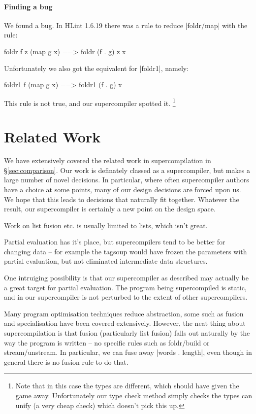 \documentclass{sigplanconf}
\begin{document}
\paragraph{Finding a bug}

We found a bug. In HLint 1.6.19 there was a rule to reduce |foldr/map| with the rule:

\begin{code}
foldr f z (map g x) ==> foldr (f . g) z x
\end{code}

Unfortunately we also got the equivalent for |foldr1|, namely:

\begin{code}
foldr1 f (map g x) ==> foldr1 (f . g) x
\end{code}

This rule is not true, and our supercompiler spotted it. \footnote{Note that in this case the types are different, which should have given the game away. Unfortunately our type check method simply checks the types can unify (a very cheap check) which doesn't pick this up.}

\section{Related Work}

We have extensively covered the related work in supercompilation in \S\ref{sec:comparison}. Our work is definately classed as a supercompiler, but makes a large number of novel decisions. In particular, where often supercompiler authors have a choice at some points, many of our design decisions are forced upon us. We hope that this leads to decisions that naturally fit together. Whatever the result, our supercompiler is certainly a new point on the design space.

Work on list fusion etc. is usually limited to lists, which isn't great.

Partial evaluation has it's place, but supercompilers tend to be better for changing data -- for example the tagsoup would have frozen the parameters with partial evaluation, but not eliminated intermediate data structures.

One intruiging possibility is that our supercompiler as described may actually be a great target for partial evaluation. The program being supercompiled is static, and in our supercompiler is not perturbed to the extent of other supercompilers.

Many program optimisation techniques reduce abstraction, some such as fusion and specialisation have been covered extensively. However, the neat thing about supercompilation is that fusion (particularly list fusion) falls out naturally by the way the program is written -- no specific rules such as foldr/build or stream/unstream. In particular, we can fuse away |words . length|, even though in general there is no fusion rule to do that.
\end{document}
